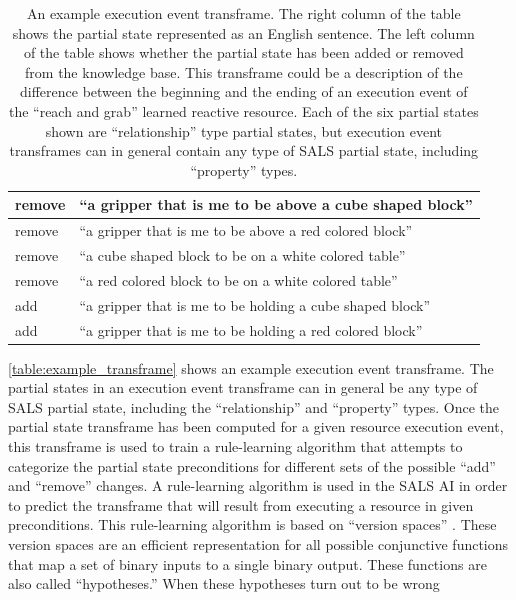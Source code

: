 \begin{table}
\centering
\begin{tabular}{|p{1.5cm}|p{9.5cm}|}
\hline
remove &``a gripper that is me to be above a cube shaped block'' \\
\hline
remove &``a gripper that is me to be above a red colored block'' \\
\hline
remove &``a cube shaped block to be on a white colored table'' \\
\hline
remove &``a red colored block to be on a white colored table'' \\
\hline
add    &``a gripper that is me to be holding a cube shaped block'' \\
\hline
add    &``a gripper that is me to be holding a red colored block'' \\
\hline
\end{tabular}
\caption[An example execution event transframe.]{An example execution
  event transframe.  The right column of the table shows the partial
  state represented as an English sentence.  The left column of the
  table shows whether the partial state has been added or removed from
  the knowledge base.  This transframe could be a description of the
  difference between the beginning and the ending of an execution
  event of the ``reach and grab'' learned reactive resource.  Each of
  the six partial states shown are ``relationship'' type partial
  states, but execution event transframes can in general contain any
  type of SALS partial state, including ``property'' types.}
\label{table:example_transframe}
\end{table}
{\mbox{\autoref{table:example_transframe}}} shows an example execution
event transframe.  The partial states in an execution event transframe
can in general be any type of SALS partial state, including the
``relationship'' and ``property'' types.  Once the partial state
transframe has been computed for a given resource execution event,
this transframe is used to train a rule-learning algorithm that
attempts to categorize the partial state preconditions for different
sets of the possible ``add'' and ``remove'' changes.  A rule-learning
algorithm is used in the SALS AI in order to predict the transframe
that will result from executing a resource in given preconditions.
This rule-learning algorithm is based on ``version spaces''
\cite[]{mitchell:1997}.  These version spaces are an efficient
representation for all possible conjunctive functions that map a set
of binary inputs to a single binary output.  These functions are also
called ``hypotheses.''  When these hypotheses turn out to be wrong
